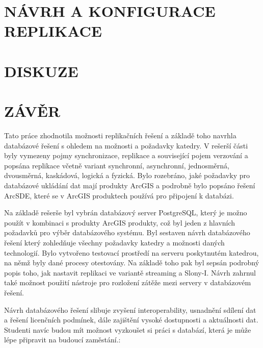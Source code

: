 \documentclass{thesisKGI}
\begin{document}
    \newpage
    \section{NÁVRH A KONFIGURACE REPLIKACE}
      
      
      
      
      
      

    \newpage
    \section{DISKUZE}

    \newpage
    \section{ZÁVĚR}
Tato práce zhodnotila možnosti replikačních řešení a základě toho navrhla databázové řešení s ohledem na možnosti a požadavky katedry. V rešerší části byly vymezeny pojmy synchronizace, replikace a související pojem verzování a popsána replikace včetně variant synchronní, asynchronní, jednosměrná, dvousměrná, kaskádová, logická a fyzická. Bylo rozebráno, jaké požadavky pro databázové ukládání dat mají produkty ArcGIS a podrobně bylo popsáno řešení ArcSDE, které se v ArcGIS produktech používá pro připojení k databázi.

Na základě rešerše byl vybrán databázový server PostgreSQL, který je možno použít v kombinaci s produkty ArcGIS produkty, což byl jeden z hlavních požadavků pro výběr databázového systému. Byl sestaven návrh databázového řešení který zohledňuje všechny požadavky katedry a možnosti daných technologií. Bylo vytvořeno testovací prostředí na serveru poskytnutém katedrou, na němž byly dané procesy otestovány. Na základě toho pak byl sepsán podrobný popis toho, jak nastavit replikaci ve variantě streaming a Slony-I. Návrh zahrnul také možnost použití nástroje pro rozložení zátěže mezi servery v databázovém řešení.

Návrh databázového řešení slibuje zvyšení interoperability,  usnadnění sdílení dat a řešení licenčních podmínek, dále zajištění vysoké dostupnosti a aktuálnosti dat. Studenti navíc budou mít možnost vyzkoušet si práci s databází, která je může lépe připravit na budoucí zaměstání.:
\end{document}
